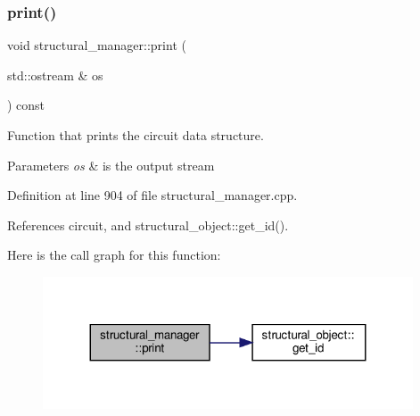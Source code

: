 \subsubsection{\texorpdfstring{print()}{print()}}
{\footnotesize\ttfamily void structural\+\_\+manager\+::print (\begin{DoxyParamCaption}\item[{std\+::ostream \&}]{os }\end{DoxyParamCaption}) const}



Function that prints the circuit data structure. 


\begin{DoxyParams}{Parameters}
{\em os} & is the output stream \\
\hline
\end{DoxyParams}


Definition at line 904 of file structural\+\_\+manager.\+cpp.



References circuit, and structural\+\_\+object\+::get\+\_\+id().

Here is the call graph for this function\+:
\nopagebreak
\begin{figure}[H]
\begin{center}
\leavevmode
\includegraphics[width=311pt]{d7/d6b/classstructural__manager_a4c435578fb3db26a42e2d834443fb2ea_cgraph}
\end{center}
\end{figure}
\mbox{\label{classstructural__manager_a587689c8dff33aaaca72b75199f683ce}} 
